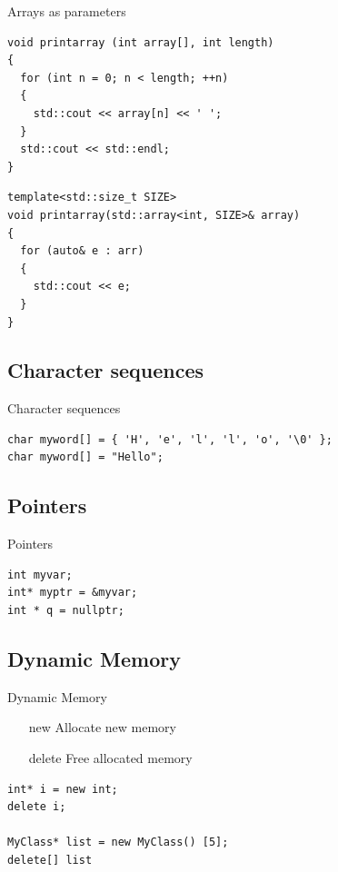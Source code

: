 \documentclass{beamer}
\begin{document}
\begin{frame}[fragile]{Arrays as parameters}
\begin{lstlisting}[caption=array as pointer]
void printarray (int array[], int length)
{
  for (int n = 0; n < length; ++n)
  {
    std::cout << array[n] << ' ';
  }
  std::cout << std::endl;
}
\end{lstlisting}

\begin{lstlisting}[caption=array as object]
template<std::size_t SIZE>
void printarray(std::array<int, SIZE>& array)
{
  for (auto& e : arr)
  {
    std::cout << e;
  }
}\end{lstlisting}
\end{frame}

\subsection{Character sequences}
\begin{frame}[fragile]{Character sequences}
\begin{lstlisting}[caption=Character sequences]
char myword[] = { 'H', 'e', 'l', 'l', 'o', '\0' };
char myword[] = "Hello";
\end{lstlisting}
\end{frame}

\subsection{Pointers}
\begin{frame}[fragile]{Pointers}
\begin{lstlisting}
int myvar;
int* myptr = &myvar;
int * q = nullptr;
\end{lstlisting}
\end{frame}

\subsection{Dynamic Memory}
\begin{frame}[fragile]{Dynamic Memory}
\begin{itemize}
  \item [new] Allocate new memory
  \item [delete] Free allocated memory
\end{itemize}
\begin{lstlisting}
int* i = new int;
delete i;

MyClass* list = new MyClass() [5];
delete[] list
\end{lstlisting}
\end{frame}
\end{document}
